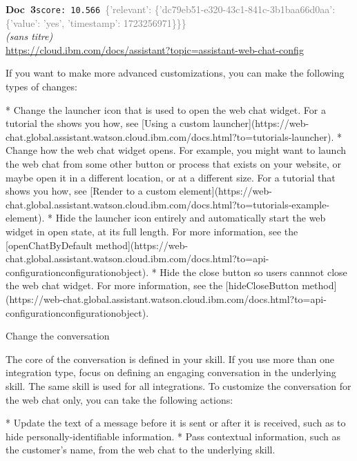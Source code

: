 \documentclass[a4paper,11pt]{article}
\begin{document}
\begin{docenv}
{\footnotesize\textcolor{doccolor}{\textbf{Doc~3}}}\hfill{\tiny\texttt{score:~10.566}}\ {\tiny\textcolor{gray}{\{'relevant': \{'dc79eb51-e320-43c1-841c-3b1baa66d0aa': \{'value': 'yes', 'timestamp': 1723256971\}\}\}}}\\[3pt]
{\small\textit{(sans titre)}}\\[2pt]
{\tiny\url{https://cloud.ibm.com/docs/assistant?topic=assistant-web-chat-config}}\\[4pt]
{\footnotesize 
If you want to make more advanced customizations, you can make the following types of changes:



* Change the launcher icon that is used to open the web chat widget. For a tutorial the shows you how, see [Using a custom launcher](https://web-chat.global.assistant.watson.cloud.ibm.com/docs.html?to=tutorials-launcher).
* Change how the web chat widget opens. For example, you might want to launch the web chat from some other button or process that exists on your website, or maybe open it in a different location, or at a different size. For a tutorial that shows you how, see [Render to a custom element](https://web-chat.global.assistant.watson.cloud.ibm.com/docs.html?to=tutorials-example-element).
* Hide the launcher icon entirely and automatically start the web widget in open state, at its full length. For more information, see the [openChatByDefault method](https://web-chat.global.assistant.watson.cloud.ibm.com/docs.html?to=api-configurationconfigurationobject).
* Hide the close button so users cannnot close the web chat widget. For more information, see the [hideCloseButton method](https://web-chat.global.assistant.watson.cloud.ibm.com/docs.html?to=api-configurationconfigurationobject).







 Change the conversation 

The core of the conversation is defined in your skill. If you use more than one integration type, focus on defining an engaging conversation in the underlying skill. The same skill is used for all integrations. To customize the conversation for the web chat only, you can take the following actions:



* Update the text of a message before it is sent or after it is received, such as to hide personally-identifiable information.
* Pass contextual information, such as the customer's name, from the web chat to the underlying skill.}
\end{docenv}
\end{document}
